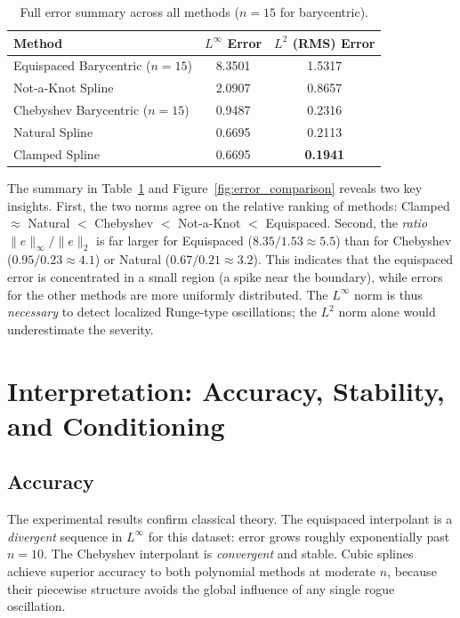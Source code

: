 \documentclass[11pt]{article}
\begin{document}
\begin{table}[h]
  \centering
  \caption{Full error summary across all methods ($n=15$ for barycentric).}
  \label{tab:summary}
  \begin{tabular}{lcc}
    \toprule
    Method & $L^\infty$ Error & $L^2$ (RMS) Error \\
    \midrule
    Equispaced Barycentric ($n=15$) & 8.3501 & 1.5317 \\
    Not-a-Knot Spline               & 2.0907 & 0.8657 \\
    Chebyshev Barycentric ($n=15$)  & 0.9487 & 0.2316 \\
    Natural Spline                  & 0.6695 & 0.2113 \\
    Clamped Spline                  & 0.6695 & \textbf{0.1941} \\
    \bottomrule
  \end{tabular}
\end{table}

The summary in Table~\ref{tab:summary} and Figure~\ref{fig:error_comparison}
reveals two key insights.  First, the two norms agree on the relative ranking
of methods: Clamped $\approx$ Natural $<$ Chebyshev $<$ Not-a-Knot $<$
Equispaced.  Second, the \emph{ratio} $\|e\|_\infty / \|e\|_2$ is far larger
for Equispaced ($8.35 / 1.53 \approx 5.5$) than for Chebyshev
($0.95 / 0.23 \approx 4.1$) or Natural ($0.67 / 0.21 \approx 3.2$).  This
indicates that the equispaced error is concentrated in a small region (a spike
near the boundary), while errors for the other methods are more uniformly
distributed.  The $L^\infty$ norm is thus \emph{necessary} to detect localized
Runge-type oscillations; the $L^2$ norm alone would underestimate the severity.

\section{Interpretation: Accuracy, Stability, and Conditioning}

\subsection{Accuracy}

The experimental results confirm classical theory.  The equispaced
interpolant is a \emph{divergent} sequence in $L^\infty$ for this dataset:
error grows roughly exponentially past $n = 10$.  The Chebyshev interpolant
is \emph{convergent} and stable.  Cubic splines achieve superior accuracy to
both polynomial methods at moderate $n$, because their piecewise structure
avoids the global influence of any single rogue oscillation.
\end{document}
